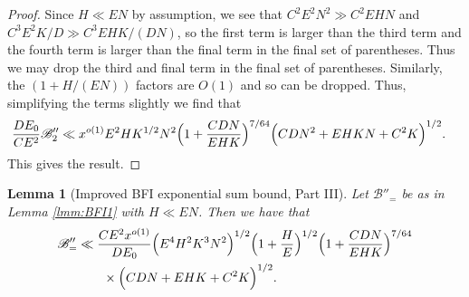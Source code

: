 \documentclass[10pt]{amsart}
\theoremstyle{plain}
\newtheorem{lmm}[thrm]{Lemma}
\numberwithin{equation}{section}
\begin{document}
\begin{proof}
Since $H\ll EN$ by assumption, we see that $C^2E^2N^2\gg C^2EHN$ and $C^3E^2K/D\gg C^3EHK/(DN)$, so the first term is larger than the third term and the fourth term is larger than the final term in the final set of parentheses. Thus we may drop the third and final term in the final set of parentheses. Similarly, the $(1+H/(EN))$ factors are $O(1)$ and so can be dropped. Thus, simplifying the terms slightly we find that
\begin{align*}
\frac{D E_0}{ C E^2}\mathscr{B}_2''&\ll  x^{o(1)}E^2 H K^{1/2} N^{2} \Bigl(1+\frac{C D N}{E H K}\Bigr)^{7/64}\Bigl( C D N^2+E H K N+C^2K\Bigr)^{1/2}.
\end{align*}
This gives the result.
\end{proof}
%
%
%
%
%
%
%
%
\begin{lmm}[Improved BFI exponential sum bound, Part III]\label{lmm:BFI3}
Let $\mathscr{B}''_{=}$ be as in Lemma \ref{lmm:BFI1} with $H\ll E N$. Then we have that
\begin{align*}
\mathscr{B}_{=}''&\ll \frac{C E^2 x^{o(1)}}{D E_0}\Bigl(E^4 H^2 K^3 N^2\Bigr)^{1/2}\Bigl(1+\frac{H}{E}\Bigr)^{1/2}\Bigl(1+\frac{C D N}{E H K}\Bigr)^{7/64}\\
&\qquad \times \Bigl(C D N+ E H K+C^2 K\Bigr)^{1/2}.
\end{align*}
\end{lmm}
%
%
%
%
\end{document}
